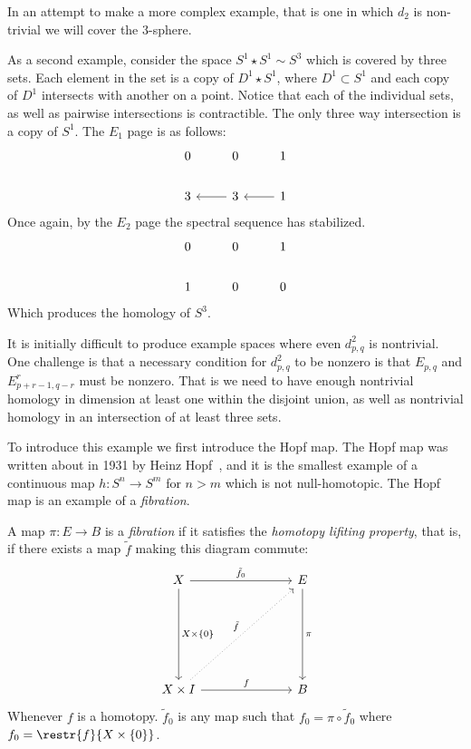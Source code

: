 In an attempt to make a more complex example, that is one in which $d_2$ is non-trivial we will cover the 3-sphere.
\begin{example}
As a second example, consider the space $S^1 \star S^1 \sim S^3$ which is covered by three sets. Each element in the set is a copy of $D^1 \star S^1$, where $D^1 \subset S^1$ and each copy of $D^1$ intersects with another on a point. Notice that each of the individual sets, as well as pairwise intersections is contractible. The only three way intersection is a copy of $S^1$. The $E_1$ page is as follows:
\[ \begin{tikzcd}
0    &  0     &   1   \\
3    & \arrow{l} 3     & \arrow{l}   1
\end{tikzcd} \]
Once again, by the $E_2$ page the spectral sequence has stabilized.
\[  \begin{tikzcd}
0    &  0     &   1   \\
1    &  0     &   0
\end{tikzcd}
\]
Which produces the homology of $S^3$.
\end{example}
It is initially difficult to produce example spaces where even $d^2_{p,q}$ is nontrivial. One challenge is that a necessary condition for $d^2_{p,q}$ to be nonzero is that $E_{p,q}$ and $E^r_{p+r-1, q-r}$ must be nonzero. That is we need to have enough nontrivial homology in dimension at least one within the disjoint union, as well as nontrivial homology in an intersection of at least three sets. 

To introduce this example we first introduce the Hopf map. The Hopf map was written about in 1931 by Heinz Hopf~\cite{hopf}, and it is the smallest example of a continuous map $h : S^n \rightarrow S^m$ for $n > m$ which is not null-homotopic. The Hopf map is an example of a \emph{fibration}.
\begin{definition}
A map $\pi: E \rightarrow B$ is a \emph{fibration} if it satisfies the \emph{homotopy lifiting property},
that is, if there exists a map $\tilde{f}$ making this diagram commute:
\[ \begin{tikzcd}[column sep=1in,row sep=1in]
X \arrow{d}{X \times \{0\}} \arrow{r}{\tilde{f}_0} & E \arrow{d}{\pi} \\
X \times I  \arrow{r}{f} \arrow[dotted]{ur}{\tilde{f}} & B
\end{tikzcd} \]
Whenever $f$ is a homotopy. $\tilde{f}_0$ is any map such that $f_0 = \pi \circ \tilde{f}_0$ where $f_0 = \restr{f}{X \times \{0\}}$.
\end{definition}	

